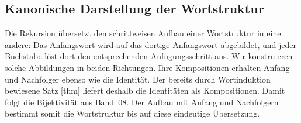 \subsection{Kanonische Darstellung der Wortstruktur}

Die Rekursion übersetzt den schrittweisen Aufbau einer Wortstruktur in
eine andere: Das Anfangswort wird auf das dortige Anfangswort abgebildet,
und jeder Buchstabe löst dort den entsprechenden Anfügungsschritt aus.
Wir konstruieren solche Abbildungen in beiden Richtungen. Ihre
Kompositionen erhalten Anfang und Nachfolger ebenso wie die Identität.
Der bereits durch Wortinduktion bewiesene Satz
[thm] liefert deshalb
die Identitäten als Kompositionen. Damit folgt die Bijektivität aus
Band~08. Der Aufbau mit Anfang und Nachfolgern bestimmt somit die
Wortstruktur bis auf diese eindeutige Übersetzung.

\noindent\begin{minipage}{\linewidth}
\end{minipage}\par
\begin{tabproofwide}
\end{tabproofwide}


